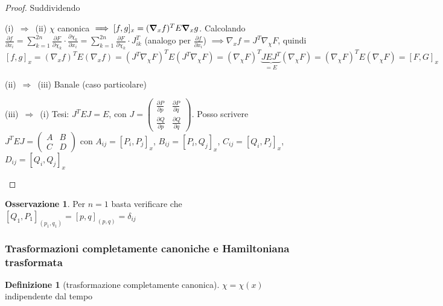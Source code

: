 \documentclass[a4paper,10pt]{article}
\theoremstyle{definition}
\theoremstyle{indentdefinition}
\newtheorem{defn}{Definizione}[section]
\theoremstyle{indenttheorem}
\theoremstyle{myremark}
\newtheorem*{rem*}{Osservazione}
\theoremstyle{indentgeneral}
\newenvironment{lyxlist}[1]
	{\begin{list}{}
		{\settowidth{\labelwidth}{#1}
		 \setlength{\leftmargin}{\labelwidth}
		 \addtolength{\leftmargin}{\labelsep}
		 \renewcommand{\makelabel}[1]{##1\hfil}}}
	{\end{list}}
\begin{document}
\begin{proof}
Suddividendo
\begin{lyxlist}{00.00.0000}
\item [{(i)~$\Rightarrow$~(ii)}] $\chi$ canonica $\implies [f,g]_x=(\grad_xf)^TE\grad_xg$. Calcolando $\frac{\partial f}{\partial x_{i}}=\sum_{k=1}^{2n}\frac{\partial F}{\partial\chi_{k}}\cdot\frac{\partial\chi_{k}}{\partial x_{i}}=\sum_{k=1}^{2n}\frac{\partial F}{\partial\chi_{k}}\cdot J_{ik}^{T}$
(analogo per $\frac{\partial f}{\partial x_{i}}$) 
$\implies\nabla_{x}f=J^{T}\nabla_{\chi}F$, quindi
\[
\left[f,g\right]_{x}=\left(\nabla_{x}f\right)^{T}E\left(\nabla_{x}f\right)=\left(J^{T}\nabla_{\chi}F\right)^{T}E\left(J^{T}\nabla_{\chi}F\right)=\left(\nabla_{\chi}F\right)^{T}\underbrace{JEJ^{T}}_{=E}\left(\nabla_{\chi}F\right)=\left(\nabla_{\chi}F\right)^{T}E\left(\nabla_{\chi}F\right)=\left[F,G\right]_{x}
\]
\item [{(ii)~$\Rightarrow$~(iii)}] Banale (caso particolare)
\item [{(iii)~$\Rightarrow$~(i)}] Tesi: $J^TEJ=E$, con $J=\begin{pmatrix}\frac{\partial P}{\partial p} & \frac{\partial P}{\partial q} \\
\frac{\partial Q}{\partial p}  & \frac{\partial Q}{\partial q} 
\end{pmatrix}$. Posso scrivere $J^{T}EJ=\begin{pmatrix}A & B\\
C & D
\end{pmatrix}$ con $A_{ij}=\left[P_{i},P_{j}\right]_{x}$, $B_{ij}=\left[P_{i},Q_{j}\right]_{x}$,
$C_{ij}=\left[Q_{i},P_{j}\right]_{x}$, $D_{ij}=\left[Q_{i},Q_{j}\right]_{x}$
\end{lyxlist}
\end{proof}
\begin{rem*}
Per $n=1$ basta verificare che $\left[Q_{1},P_{1}\right]_{\left(p_{1},q_{1}\right)}=\left[p,q\right]_{\left(p,q\right)}=\delta_{ij}$
\end{rem*}

\subsubsection{Trasformazioni completamente canoniche e Hamiltoniana trasformata}
\begin{defn}[trasformazione completamente canonica]
\label{def:trasformazione-completamente-canonica}$\chi=\chi\left(x\right)$
indipendente dal tempo
\end{defn}
\end{document}
